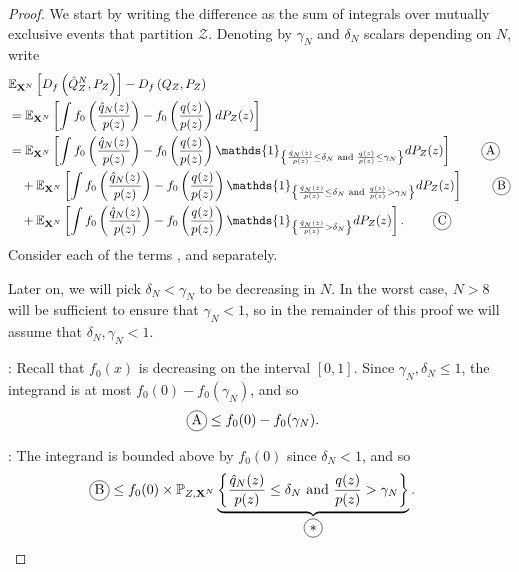 \begin{proof}
We start by writing the difference as the sum of integrals over mutually exclusive events that partition $\mathcal{Z}$.
Denoting by $\gamma_N$ and $\delta_N$ scalars depending on $N$, write
%
\begin{align*}
    & \E_{\XN} \left[ D_f\left( \hat{Q}_Z^N , P_Z\right)\right] - D_f\left( Q_{Z} , P_Z\right)  \\
    &= \E_{\XN} \left[\int f_0\left( \frac{\hat{q}_N(z)}{p(z)} \right) - f_0\left( \frac{q(z)}{p(z)} \right) dP_Z(z) \right] \\
    &= \E_{\XN} \left[ \int f_0\left( \frac{\hat{q}_N(z)}{p(z)} \right) - f_0\left( \frac{q(z)}{p(z)} \right) \mathds{1}_{\left\lbrace \frac{\hat{q}_N(z)}{p(z)} \leq \delta_N \text{ and } \frac{q(z)}{p(z)} \leq \gamma_N \right\rbrace} dP_Z(z) \right] \tag*{\encircle{A}}\\
    & \quad + \E_{\XN} \left[\int f_0\left( \frac{\hat{q}_N(z)}{p(z)} \right) - f_0\left( \frac{q(z)}{p(z)} \right) \mathds{1}_{\left\lbrace \frac{\hat{q}_N(z)}{p(z)} \leq \delta_N \text{ and } \frac{q(z)}{p(z)} > \gamma_N \right\rbrace} dP_Z(z) \right]\tag*{\encircle{B}}\\
    & \quad + \E_{\XN} \left[ \int f_0\left( \frac{\hat{q}_N(z)}{p(z)} \right) - f_0\left( \frac{q(z)}{p(z)} \right) \mathds{1}_{\left\lbrace \frac{\hat{q}_N(z)}{p(z)} > \delta_N \right\rbrace} dP_Z(z) \right]. \tag*{\encircle{C}}
\end{align*}
%
Consider each of the terms ,  and   separately.

Later on, we will pick $\delta_N < \gamma_N$ to be decreasing in $N$.
In the worst case, $N>8$ will be sufficient to ensure that $\gamma_N < 1$, so in the remainder of this proof we will assume that $\delta_N, \gamma_N < 1$.

: 
Recall that $f_0(x)$ is decreasing on the interval $[0,1]$.
Since $\gamma_N, \delta_N \leq 1$, the integrand is at most $f_0(0) - f_0(\gamma_N)$, and so
\begin{align*}
    \encircle{A} &\leq f_0(0) - f_0(\gamma_N).
\end{align*}


:
The integrand is bounded above by $f_0(0)$ since $\delta_N<1$, and so 
\begin{align*}
    \encircle{B} &\leq f_0(0) \times \mathbb{P}_{Z,\XN}
    \underbrace{
    \left\lbrace \frac{\hat{q}_N(z)}{p(z)} \leq \delta_N \text{ and } \frac{q(z)}{p(z)} > \gamma_N \right\rbrace}_{\encircle{$*$}}.
\end{align*}


\end{proof}
